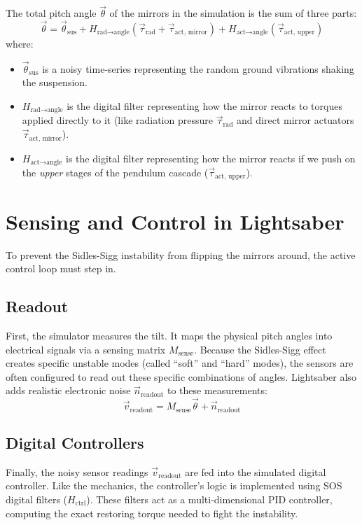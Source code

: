 \documentclass{article}
\begin{document}
The total pitch angle $\vec{\theta}$ of the mirrors in the simulation is the sum of three parts:
\begin{equation}
    \vec{\theta} = \vec{\theta}_{\text{sus}} + H_{\text{rad} \to \text{angle}} (\vec{\tau}_{\text{rad}} + \vec{\tau}_{\text{act, mirror}}) + H_{\text{act} \to \text{angle}} (\vec{\tau}_{\text{act, upper}})
\end{equation}
where:
\begin{itemize}
    \item $\vec{\theta}_{\text{sus}}$ is a noisy time-series representing the random ground vibrations shaking the suspension.
    \item $H_{\text{rad} \to \text{angle}}$ is the digital filter representing how the mirror reacts to torques applied directly to it (like radiation pressure $\vec{\tau}_{\text{rad}}$ and direct mirror actuators $\vec{\tau}_{\text{act, mirror}}$).
    \item $H_{\text{act} \to \text{angle}}$ is the digital filter representing how the mirror reacts if we push on the \textit{upper} stages of the pendulum cascade ($\vec{\tau}_{\text{act, upper}}$).
\end{itemize}

\section{Sensing and Control in Lightsaber}
To prevent the Sidles-Sigg instability from flipping the mirrors around, the active control loop must step in.

\subsection{Readout}
First, the simulator measures the tilt. It maps the physical pitch angles into electrical signals via a sensing matrix $M_{\text{sense}}$. Because the Sidles-Sigg effect creates specific unstable modes (called ``soft'' and ``hard'' modes), the sensors are often configured to read out these specific combinations of angles. Lightsaber also adds realistic electronic noise $\vec{n}_{\text{readout}}$ to these measurements:
\begin{equation}
    \vec{v}_{\text{readout}} = M_{\text{sense}} \vec{\theta} + \vec{n}_{\text{readout}}
\end{equation}

\subsection{Digital Controllers}
Finally, the noisy sensor readings $\vec{v}_{\text{readout}}$ are fed into the simulated digital controller. Like the mechanics, the controller's logic is implemented using SOS digital filters ($H_{\text{ctrl}}$). These filters act as a multi-dimensional PID controller, computing the exact restoring torque needed to fight the instability.
\end{document}

